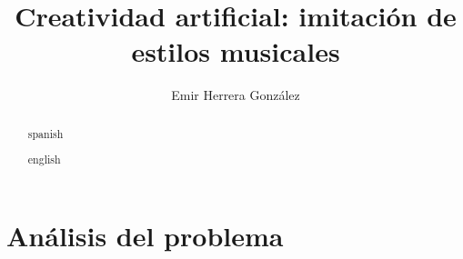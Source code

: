 \documentclass{tesisITAM}
\title{Creatividad artificial: imitación de estilos musicales}
\author{Emir Herrera González}
\begin{document}
	\maketitle
	\publicationrights


	\begin{abstract}{spanish}
	\end{abstract}

	\begin{abstract}{english}
	\end{abstract}


	\setcounter{page}{1}

	\tableofcontents
	\listoffigures
	\listoftables
	\newpage

	\setcounter{page}{1}


		\chapter{Análisis del problema}
			\label{ch:analisis}

			
			
			
			
			

    
    
    
		
    








	\appendix

	\clearpage
	
	
\end{document}

